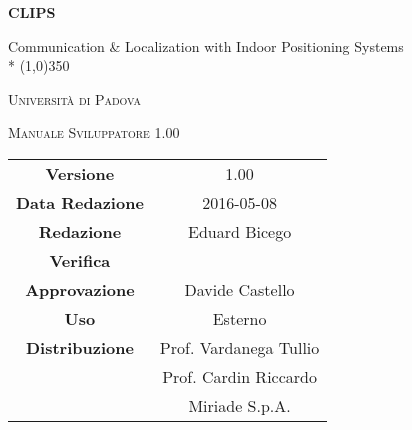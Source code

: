 \documentclass[a4paper,12pt]{article}
\author{Eduard Bicego}
\date{08/05/2016}
\begin{document}
\begin{titlepage}
	\centering
	{\huge\bfseries CLIPS\par}
	Communication \& Localization with Indoor Positioning Systems \\*
	\line(1,0){350} \\
	{\scshape\LARGE Università di Padova \par}
	\vspace{1cm}
	{\scshape\Large Manuale Sviluppatore 1.00 \par}
	\logo
	\newpage
	\begin{tabular}{c|c}
		{\hfill \textbf{Versione}} 			& 1.00						\\
		{\hfill\textbf{Data Redazione}} 	& 2016-05-08  				\\
		{\hfill\textbf{Redazione}} 			& Eduard Bicego				\\
		{\hfill\textbf{Verifica}} 			&  							\\
		{\hfill\textbf{Approvazione}} 		& Davide Castello			\\
		{\hfill\textbf{Uso}} 				& Esterno					\\
		{\hfill\textbf{Distribuzione}} 		& Prof. Vardanega Tullio	\\
											& Prof. Cardin Riccardo 	\\
											& Miriade S.p.A. 			\\
	\end{tabular}
\end{titlepage}
	
	\newpage
	\pagestyle{myfront}
	
		\newpage
			
		\newpage
			\tableofcontents
		\newpage
			\listoffigures
	\label{LastFrontPage}

	\newpage
		\pagestyle{mymain}
	\newpage
		
	\newpage
		
	\newpage
		
	\newpage
		
		
	\newpage
		
	\newpage
		


		
	\label{LastPage}
\end{document}
